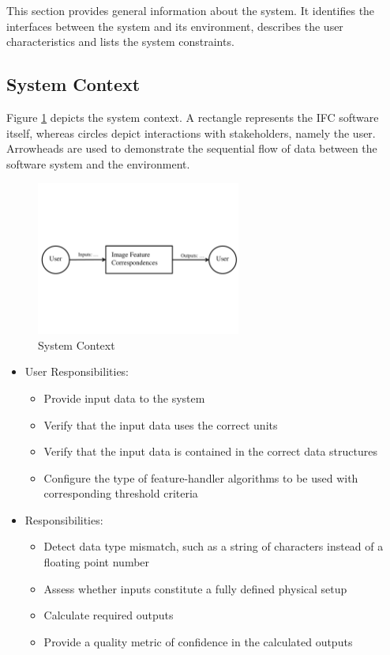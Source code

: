 \documentclass[12pt]{article}
\begin{document}
This section provides general information about the system.  It identifies the
interfaces between the system and its environment, describes the user
characteristics and lists the system constraints.

\subsection{System Context}
Figure \ref{Fig_SystemContext} depicts the system context. A rectangle represents 
the IFC software itself, whereas circles depict interactions with stakeholders, 
namely the user. Arrowheads are used to demonstrate the sequential flow of data 
between the software system and the environment.

\begin{figure}[h!]
\begin{center}
 \includegraphics[width=0.6\textwidth]{SystemContextFigure}
\caption{System Context}
\label{Fig_SystemContext} 
\end{center}
\end{figure}

\begin{itemize}
\item User Responsibilities:
\begin{itemize}
\item Provide input data to the system
\item Verify that the input data uses the correct units
\item Verify that the input data is contained in the correct data structures
\item Configure the type of feature-handler algorithms to be used with corresponding 
threshold criteria
\end{itemize}
\item \progname{} Responsibilities:
\begin{itemize}
\item Detect data type mismatch, such as a string of characters instead of a
  floating point number
\item Assess whether inputs constitute a fully defined physical setup
\item Calculate required outputs
\item Provide a quality metric of confidence in the calculated outputs
\end{itemize}
\end{itemize}
\end{document}
